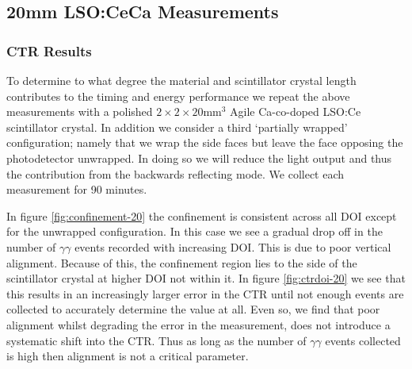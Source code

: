 \subsection{20mm LSO:CeCa Measurements}
\label{sec:20mm}
\subsubsection{CTR Results}
To determine to what degree the material and scintillator crystal length contributes to the timing and energy performance we repeat the above measurements with a polished $2\times2\times20$mm$^3$ Agile Ca-co-doped LSO:Ce scintillator crystal. In addition we consider a third `partially wrapped' configuration; namely that we wrap the side faces but leave the face opposing the photodetector unwrapped. In doing so we will reduce the light output and thus the contribution from the backwards reflecting mode. We collect each measurement for 90 minutes.

In figure \ref{fig:confinement-20} the confinement is consistent across all DOI except for the unwrapped configuration. In this case we see a gradual drop off in the number of $\gamma\gamma$ events recorded with increasing DOI. This is due to poor vertical alignment. Because of this, the confinement region lies to the side of the scintillator crystal at higher DOI not within it. In figure \ref{fig:ctrdoi-20} we see that this results in an increasingly larger error in the CTR until not enough events are collected to accurately determine the value at all. Even so, we find that poor alignment whilst degrading the error in the measurement, does not introduce a systematic shift into the CTR. Thus as long as the number of $\gamma\gamma$ events collected is high then alignment is not a critical parameter. 
